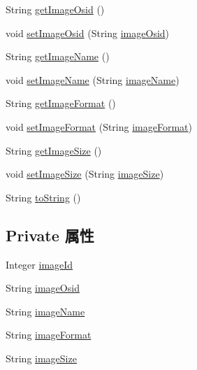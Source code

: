 \begin{DoxyCompactItemize}
\item 
String \mbox{\hyperlink{classcom_1_1example_1_1demo_1_1modular_1_1_image_afa16e4fe9e198cc26c66dfdf402d87c0}{get\+Image\+Osid}} ()
\item 
void \mbox{\hyperlink{classcom_1_1example_1_1demo_1_1modular_1_1_image_a0177d01faff687b5728bdd9290add005}{set\+Image\+Osid}} (String \mbox{\hyperlink{classcom_1_1example_1_1demo_1_1modular_1_1_image_af741ae48c80ac4463a6ec745f8031281}{image\+Osid}})
\item 
String \mbox{\hyperlink{classcom_1_1example_1_1demo_1_1modular_1_1_image_a8a3082f5f450d0b1d1c28d787b5bf2b8}{get\+Image\+Name}} ()
\item 
void \mbox{\hyperlink{classcom_1_1example_1_1demo_1_1modular_1_1_image_a788ac284afd9131b8db9f0e8f10e30b2}{set\+Image\+Name}} (String \mbox{\hyperlink{classcom_1_1example_1_1demo_1_1modular_1_1_image_a60502bbc6bab0885108008533d27f2ef}{image\+Name}})
\item 
String \mbox{\hyperlink{classcom_1_1example_1_1demo_1_1modular_1_1_image_afe5c3ce519ae6d32bfbba102a75fd629}{get\+Image\+Format}} ()
\item 
void \mbox{\hyperlink{classcom_1_1example_1_1demo_1_1modular_1_1_image_aa052623d496394f64bff788d1566f1fc}{set\+Image\+Format}} (String \mbox{\hyperlink{classcom_1_1example_1_1demo_1_1modular_1_1_image_a4ffd48e614a03eea6d25032154fc0e68}{image\+Format}})
\item 
String \mbox{\hyperlink{classcom_1_1example_1_1demo_1_1modular_1_1_image_aa35d33d91cb526fcd5db04844ec46eac}{get\+Image\+Size}} ()
\item 
void \mbox{\hyperlink{classcom_1_1example_1_1demo_1_1modular_1_1_image_af32f816a78535c2cefd7e8ddc264c885}{set\+Image\+Size}} (String \mbox{\hyperlink{classcom_1_1example_1_1demo_1_1modular_1_1_image_a5e71bd39f3465c6ec72f03ae6eed54a1}{image\+Size}})
\item 
String \mbox{\hyperlink{classcom_1_1example_1_1demo_1_1modular_1_1_image_a2227e53e207778bdea49fa3fa13f02fe}{to\+String}} ()
\end{DoxyCompactItemize}
\subsection*{Private 属性}
\begin{DoxyCompactItemize}
\item 
Integer \mbox{\hyperlink{classcom_1_1example_1_1demo_1_1modular_1_1_image_a9019827cd65b58f00146b6b1dc31e92e}{image\+Id}}
\item 
String \mbox{\hyperlink{classcom_1_1example_1_1demo_1_1modular_1_1_image_af741ae48c80ac4463a6ec745f8031281}{image\+Osid}}
\item 
String \mbox{\hyperlink{classcom_1_1example_1_1demo_1_1modular_1_1_image_a60502bbc6bab0885108008533d27f2ef}{image\+Name}}
\item 
String \mbox{\hyperlink{classcom_1_1example_1_1demo_1_1modular_1_1_image_a4ffd48e614a03eea6d25032154fc0e68}{image\+Format}}
\item 
String \mbox{\hyperlink{classcom_1_1example_1_1demo_1_1modular_1_1_image_a5e71bd39f3465c6ec72f03ae6eed54a1}{image\+Size}}
\end{DoxyCompactItemize}



